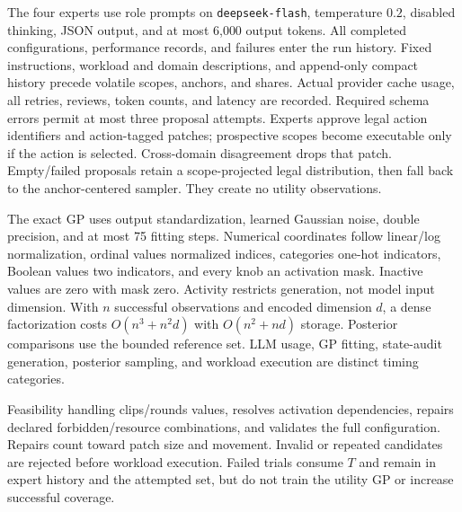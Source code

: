 The four experts use role prompts on \texttt{deepseek-flash}, temperature
$0.2$, disabled thinking, JSON output, and at most 6,000 output tokens.
All completed configurations, performance records, and failures enter the
run history. Fixed instructions, workload and domain descriptions, and append-only
compact history precede volatile scopes, anchors, and shares. Actual
provider cache usage, all retries, reviews, token counts, and latency are
recorded. Required schema errors permit at most three proposal attempts.
Experts approve legal action identifiers and action-tagged patches;
prospective scopes become executable only if the action is selected.
Cross-domain disagreement drops that patch. Empty/failed proposals retain
a scope-projected legal distribution, then fall back to the anchor-centered
sampler. They create no utility observations.

The exact GP uses output standardization, learned Gaussian noise, double
precision, and at most 75 fitting steps. Numerical coordinates follow
linear/log normalization, ordinal values normalized indices, categories
one-hot indicators, Boolean values two indicators, and every knob an
activation mask. Inactive values are zero with mask zero. Activity restricts
generation, not model input dimension. With $n$ successful observations and
encoded dimension $d$, a dense factorization costs $O(n^3+n^2d)$ with
$O(n^2+nd)$ storage. Posterior comparisons use the bounded reference set.
LLM usage, GP fitting, state-audit generation, posterior sampling, and
workload execution are distinct timing categories.

Feasibility handling clips/rounds values, resolves activation dependencies,
repairs declared forbidden/resource combinations, and validates the full
configuration. Repairs count toward patch size and movement. Invalid or
repeated candidates are rejected before workload execution. Failed trials
consume $T$ and remain in expert history and the attempted set, but do
not train the utility GP or increase successful coverage.
